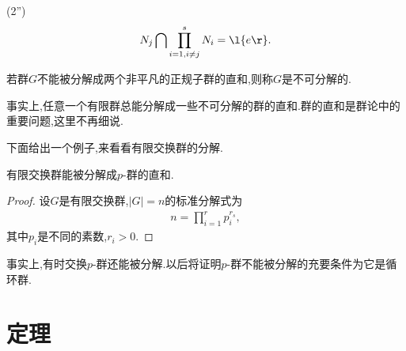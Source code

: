 (2'')\begin{align*}
    N_j\bigcap\prod_{i=1,i\neq j}^{s}N_i=\l\{e\r\}.
\end{align*}
\begin{definition}[不可分解的]
    若群$G$不能被分解成两个非平凡的正规子群的直和,则称$G$是不可分解的.
\end{definition}
事实上,任意一个有限群总能分解成一些不可分解的群的直和.群的直和是群论中的重要问题,这里不再细说.

下面给出一个例子,来看看有限交换群的分解.
\begin{example}
    有限交换群能被分解成$p$-群的直和.
\end{example}
\begin{proof}
    设$G$是有限交换群,$|G|=n$的标准分解式为\begin{align*}
        n=\prod_{i=1}^{r}p_i^{r_s},
    \end{align*}其中$p_i$是不同的素数,$r_i>0$.

    \stars
\end{proof}
\begin{remark}
    事实上,有时交换$p$-群还能被分解.以后将证明$p$-群不能被分解的充要条件为它是循环群.
\end{remark}










\section{{\JH}定理}
